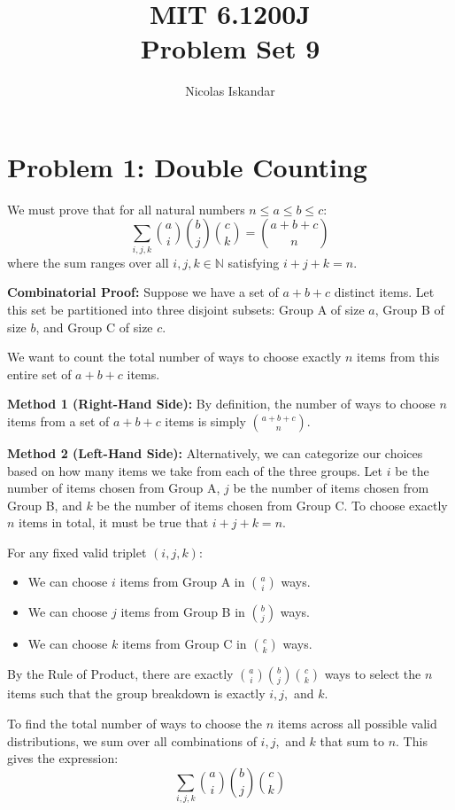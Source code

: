 \documentclass[11pt]{article}
\title{
    \vspace{-2em}
    MIT 6.1200J \\
    Problem Set 9
}
\author{Nicolas Iskandar}
\date{}
\begin{document}
\maketitle

\section*{Problem 1: Double Counting}

We must prove that for all natural numbers $n \le a \le b \le c$:
$$ \sum_{i,j,k} \binom{a}{i} \binom{b}{j} \binom{c}{k} = \binom{a+b+c}{n} $$
where the sum ranges over all $i, j, k \in \mathbb{N}$ satisfying $i+j+k=n$.

\textbf{Combinatorial Proof:}
Suppose we have a set of $a+b+c$ distinct items. Let this set be partitioned into three disjoint subsets: Group A of size $a$, Group B of size $b$, and Group C of size $c$. 

We want to count the total number of ways to choose exactly $n$ items from this entire set of $a+b+c$ items.

\textbf{Method 1 (Right-Hand Side):} 
By definition, the number of ways to choose $n$ items from a set of $a+b+c$ items is simply $\binom{a+b+c}{n}$. 

\textbf{Method 2 (Left-Hand Side):}
Alternatively, we can categorize our choices based on how many items we take from each of the three groups. Let $i$ be the number of items chosen from Group A, $j$ be the number of items chosen from Group B, and $k$ be the number of items chosen from Group C. To choose exactly $n$ items in total, it must be true that $i + j + k = n$.

For any fixed valid triplet $(i, j, k)$:
\begin{itemize}
    \item We can choose $i$ items from Group A in $\binom{a}{i}$ ways.
    \item We can choose $j$ items from Group B in $\binom{b}{j}$ ways.
    \item We can choose $k$ items from Group C in $\binom{c}{k}$ ways.
\end{itemize}
By the Rule of Product, there are exactly $\binom{a}{i} \binom{b}{j} \binom{c}{k}$ ways to select the $n$ items such that the group breakdown is exactly $i, j,$ and $k$. 

To find the total number of ways to choose the $n$ items across all possible valid distributions, we sum over all combinations of $i, j,$ and $k$ that sum to $n$. This gives the expression:
$$ \sum_{i,j,k} \binom{a}{i} \binom{b}{j} \binom{c}{k} $$
\end{document}
